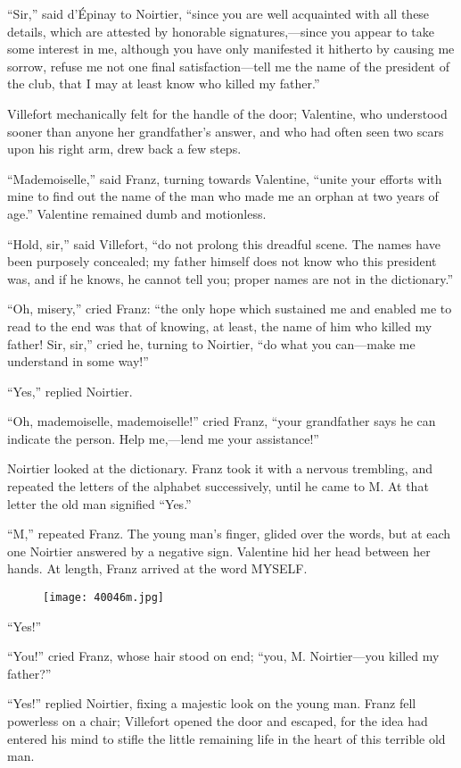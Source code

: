 “Sir,” said d’Épinay to Noirtier, “since you are well acquainted with
all these details, which are attested by honorable signatures,—since
you appear to take some interest in me, although you have only
manifested it hitherto by causing me sorrow, refuse me not one final
satisfaction—tell me the name of the president of the club, that I may
at least know who killed my father.”

Villefort mechanically felt for the handle of the door; Valentine, who
understood sooner than anyone her grandfather’s answer, and who had
often seen two scars upon his right arm, drew back a few steps.

“Mademoiselle,” said Franz, turning towards Valentine, “unite your
efforts with mine to find out the name of the man who made me an orphan
at two years of age.” Valentine remained dumb and motionless.

“Hold, sir,” said Villefort, “do not prolong this dreadful scene. The
names have been purposely concealed; my father himself does not know
who this president was, and if he knows, he cannot tell you; proper
names are not in the dictionary.”

“Oh, misery,” cried Franz: “the only hope which sustained me and
enabled me to read to the end was that of knowing, at least, the name
of him who killed my father! Sir, sir,” cried he, turning to Noirtier,
“do what you can—make me understand in some way!”

“Yes,” replied Noirtier.

“Oh, mademoiselle, mademoiselle!” cried Franz, “your grandfather says
he can indicate the person. Help me,—lend me your assistance!”

Noirtier looked at the dictionary. Franz took it with a nervous
trembling, and repeated the letters of the alphabet successively, until
he came to M. At that letter the old man signified “Yes.”

“M,” repeated Franz. The young man’s finger, glided over the words, but
at each one Noirtier answered by a negative sign. Valentine hid her
head between her hands. At length, Franz arrived at the word MYSELF.

\begin{figure}[ht]
\texttt{[image: 40046m.jpg]}
\end{figure}

“Yes!”

“You!” cried Franz, whose hair stood on end; “you, M. Noirtier—you
killed my father?”

“Yes!” replied Noirtier, fixing a majestic look on the young man. Franz
fell powerless on a chair; Villefort opened the door and escaped, for
the idea had entered his mind to stifle the little remaining life in
the heart of this terrible old man.
